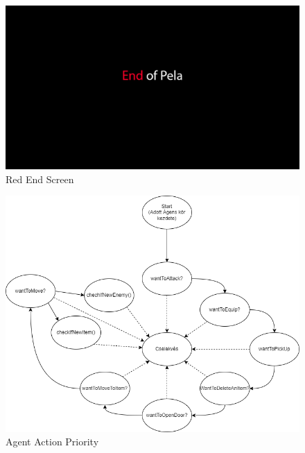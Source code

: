 \begin{figure}[!ht]
	\centering
	\includegraphics[scale=0.3]{images/endscreenred.png}
	\caption{Red End Screen}
	\label{fig:RedEndScreen}
\end{figure}

\begin{figure}[!ht]
	\centering
	\includegraphics[scale=0.6]{images/agentfunction.png}
	\caption{Agent Action Priority}
	\label{fig:Priority}
\end{figure}


